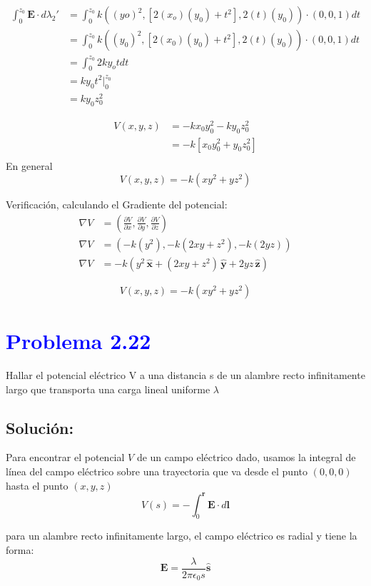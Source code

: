 \documentclass[12pt]{article}
\newcommand{\question}[1]{\textcolor{blue}{\textbf{#1}}}
\begin{document}
\begin{align*}
    \int_0^{z_0} \mathbf{E}\cdot d \lambda_2'& =  \int_0^{z_0} k((yo)^2,[2(x_o)(y_0) + t^2],2(t)(y_0)) \cdot (0,0,1)dt\\
    & = \int_0^{z_0} k((y_0)^2,[2(x_0)(y_0) + t^2],2(t)(y_0)) \cdot (0,0,1)dt\\
    & = \int_0^{z_0} 2ky_o t dt\\
    & = ky_0 t^2 \bigg|_0^{z_0} \\
    & = ky_0 z_0^2
\end{align*}

\begin{align*}
    V(x,y,z)& = -kx_0 y_0^2 - ky_0 z_0^2\\
& =-k[x_0y_0^2 + y_0z_0^2] \\
\end{align*}
En general 
\[\boxed{ V(x,y,z) = -k(xy^2 + yz^2)}\]


Verificación, calculando el Gradiente del potencial:
\begin{align*}
    \nabla V & = \left(\frac{\partial V}{\partial x}, \frac{\partial V}{\partial y}, \frac{\partial V}{\partial z}\right) \\
    \nabla V & = \left(-k(y^2), -k(2xy + z^2), -k(2yz)\right) \\
    \nabla V  & = -k\left(y^2\,\hat{\mathbf{x}} + (2xy + z^2)\,\hat{\mathbf{y}} + 2yz\,\hat{\mathbf{z}}\right) 
\end{align*}

\[
    \boxed{V(x,y,z) = -k(xy^2 + yz^2)}
\]


\section*{\question{ Problema 2.22}} Hallar el potencial eléctrico V a una distancia s de un alambre recto infinitamente largo que transporta una carga lineal uniforme \(\lambda\)

\subsection*{Solución:}
Para encontrar el potencial \(V\) de un campo eléctrico dado,  usamos la integral de línea del campo eléctrico sobre una trayectoria que va desde el punto \((0,0,0)\) hasta el punto \((x,y,z)\)
\[
{V(s)} = -\int_{0}^{\mathbf{r}} \mathbf{E}\cdot d \mathbf{l}   
\]    

para un alambre recto infinitamente largo, el campo eléctrico es radial y tiene la forma:
\[
\mathbf{E} = \frac{\lambda}{2\pi \epsilon_0 s} \hat{\mathbf{s}}
\]
\end{document}

